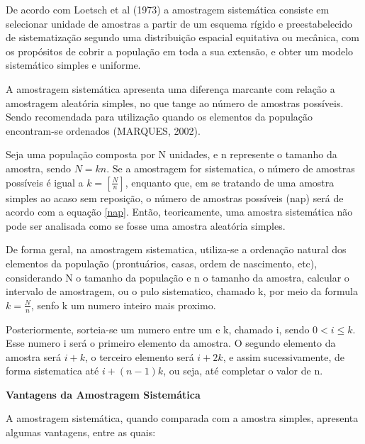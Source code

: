 De acordo com Loetsch et al (1973) a amostragem sistemática consiste em selecionar unidade de amostras a partir
de um esquema rígido e preestabelecido de sistematização segundo uma distribuição espacial equitativa ou mecânica, com os propósitos de cobrir a população em toda a sua extensão, e obter um modelo sistemático simples e uniforme.\vskip0.3cm


A amostragem sistemática apresenta uma diferença marcante com relação a amostragem aleatória simples, no que tange
ao número de amostras possíveis. Sendo recomendada para utilização quando os elementos da população encontram-se
ordenados (MARQUES, 2002).\vskip0.3cm


\newpage
Seja uma população composta por N unidades, e n represente o tamanho da amostra, sendo $N=kn$. Se a amostragem for sistematica, o número de amostras possíveis é igual a $k =\left[ \frac{N}{n} \right] $, enquanto que, em se tratando de uma amostra simples ao acaso sem reposição, o número de amostras possíveis (nap) será de acordo com a equação \ref{nap}. Então, teoricamente, uma amostra sistemática não pode ser analisada como se fosse uma amostra aleatória simples. \vskip0.3cm



De forma geral, na amostragem sistematica, utiliza-se a ordenação
natural dos elementos da população (prontuários, casas, ordem de
nascimento, etc), considerando N o tamanho da população e n o
tamanho da amostra, calcular o intervalo de amostragem, ou o pulo
sistematico, chamado k, por meio da formula $k=\frac{N}{n}$, senfo
k um numero inteiro mais proximo.\vskip0.3cm

Posteriormente, sorteia-se um numero entre um e k, chamado i,
sendo $0 < i \leq k$. Esse numero i será o primeiro elemento da
amostra. O segundo elemento da amostra será $i+k$, o terceiro
elemento será $i+2k$, e assim sucessivamente, de forma sistematica
até $i+(n-1)k$, ou seja, até completar o valor de n.

\vskip0.3cm


\textbf{Vantagens da Amostragem Sistemática}
\vskip0.3cm

A amostragem sistemática, quando comparada com a amostra simples, apresenta algumas vantagens, entre as quais:



